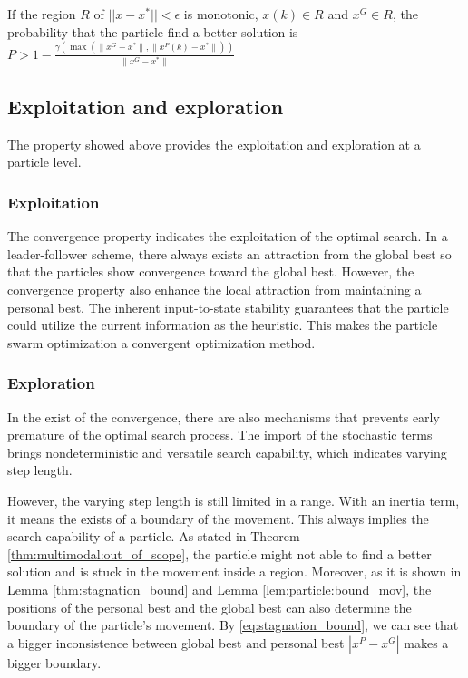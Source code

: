 \begin{mythm}
\label{thm:multimodal:in_scope}
If the region $ R $ of $ || x - x^{*} || < \epsilon $ is monotonic, $ x(k) \in R $ and $ x^{G} \in R $, the probability that the particle find a better solution is $ P > 1 - \frac{ \gamma ( \max ( \lVert x^{G} - x^{*} \rVert , \lVert x^{P}(k) - x^{*}  \rVert ) ) }{ \lVert x^{G} - x^{*} \rVert } $
\end{mythm} 

\subsection{Exploitation and exploration}

The property showed above provides the exploitation and exploration at a particle level.

\subsubsection{Exploitation}

The convergence property indicates the exploitation of the optimal search.
In a leader-follower scheme, there always exists an attraction from the global best so that the particles show convergence toward the global best.
However, the convergence property also enhance the local attraction from maintaining a personal best.
The inherent input-to-state stability guarantees that the particle could utilize the current information as the heuristic.
This makes the particle swarm optimization a convergent optimization method.

\subsubsection{Exploration}

In the exist of the convergence, there are also mechanisms that prevents early premature of the optimal search process.
The import of the stochastic terms brings nondeterministic and versatile search capability, which indicates varying step length.

However, the varying step length is still limited in a range. 
With an inertia term, it means the exists of a boundary of the movement.
This always implies the search capability of a particle.
As stated in Theorem \ref{thm:multimodal:out_of_scope}, the particle might not able to find a better solution and is stuck in the movement inside a region.
Moreover, as it is shown in Lemma \ref{thm:stagnation_bound} and Lemma \ref{lem:particle:bound_mov}, the positions of the personal best and the global best can also determine the boundary of the particle's movement.
By \eqref{eq:stagnation_bound}, we can see that a bigger inconsistence between global best and personal best $ | x^{P} - x^{G} | $ makes a bigger boundary.


